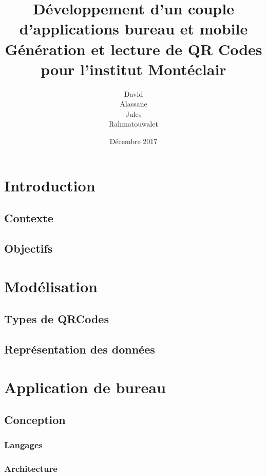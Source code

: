 \documentclass{report}
\title{%
		Développement d'un couple d'applications bureau et mobile\\ \large
		Génération et lecture de QR Codes pour l'institut Montéclair}
\author{David \bsc{Dembele}\\ Alassane \bsc{Diop}\\
		Jules \bsc{Leguy}\\ Rahmatouwalet \bsc{Mohamedoun}}
\date{Décembre 2017}
\begin{document}
\maketitle

\tableofcontents

\chapter{Introduction}

	\section{Contexte}
		
	
	\section{Objectifs}
		


		
\chapter{Modélisation}

	\section{Types de QRCodes}
		
		
	\section{Représentation des données}
		
		

\chapter{Application de bureau}

	\section{Conception}
		
		\subsection{Langages}
			
			
		\subsection{Architecture}		
			
			
\end{document}
